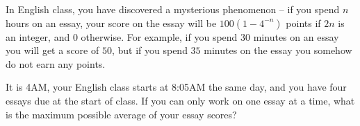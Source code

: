 In English class, you have discovered a mysterious phenomenon -- if you spend $n$ hours on an essay, your score on the essay will be $100\left( 1-4^{-n} \right)$ points if $2n$ is an integer, and $0$ otherwise. For example, if you spend $30$ minutes on an essay you will get a score of $50$, but if you spend $35$ minutes on the essay you somehow do not earn any points.

It is 4AM, your English class starts at 8:05AM the same day, and you have four essays due at the start of class. If you can only work on one essay at a time, what is the maximum possible average of your essay scores?
